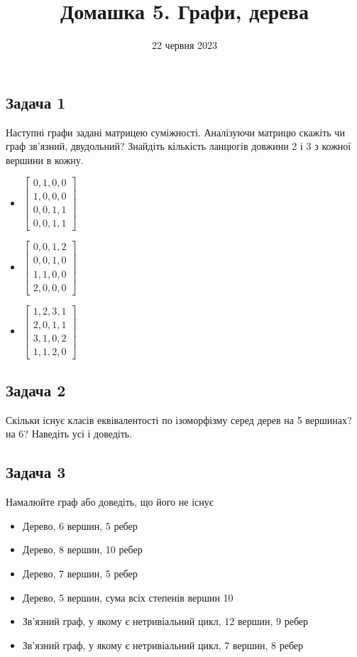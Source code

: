 \documentclass{article}
\begin{document}
\title{Домашка 5. Графи, дерева}
\date{22 червня 2023}

\maketitle

\subsection*{Задача 1}
Наступні графи задані матрицею суміжності. Аналізуючи матрицю скажіть чи граф зв'язний, двудольний? Знайдіть кількість
ланцюгів довжини 2 і 3 з кожної вершини в кожну.
\begin{itemize}
    \item
        $\begin{bmatrix}
            0,1,0,0 \\
            1,0,0,0 \\
            0,0,1,1 \\
            0,0,1,1
        \end{bmatrix}$
    \item
        $\begin{bmatrix}
            0,0,1,2 \\
            0,0,1,0 \\
            1,1,0,0 \\
            2,0,0,0
        \end{bmatrix}$
    \item
        $\begin{bmatrix}
            1,2,3,1 \\
            2,0,1,1 \\
            3,1,0,2 \\
            1,1,2,0
        \end{bmatrix}$
\end{itemize}

\subsection*{Задача 2}
Скільки існує класів еквівалентості по ізоморфізму серед дерев на 5 вершинах? на 6? Наведіть усі і доведіть.

\subsection*{Задача 3}
Намалюйте граф або доведіть, що його не існує
\begin{itemize}
    \item Дерево, 6 вершин, 5 ребер
    \item Дерево, 8 вершин, 10 ребер
    \item Дерево, 7 вершин, 5 ребер
    \item Дерево, 5 вершин, сума всіх степенів вершин 10
    \item Зв'язний граф, у якому є нетривіальний цикл, 12 вершин, 9 ребер
    \item Зв'язний граф, у якому є нетривіальний цикл, 7 вершин, 8 ребер
\end{itemize}
\end{document}
